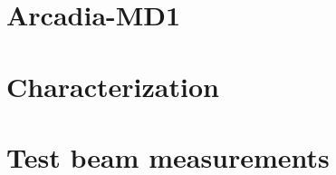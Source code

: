 \documentclass[a4paper,11pt]{report}
\begin{document}
\linenumbers



\tableofcontents




%

%

%

%

\chapter{Arcadia-MD1}


\chapter{Characterization}


\chapter{Test beam measurements}


\printbibliography[heading=bibintoc, title={Bibliography}] 
\end{document}
